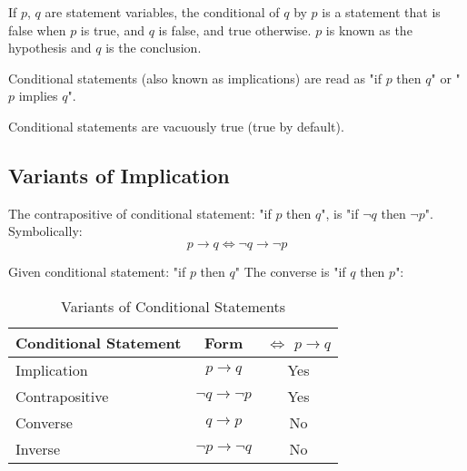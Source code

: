 \documentclass[11pt]{article}
\begin{document}
\begin{definition}[Conditional]\label{def:conditional}
    If $p$, $q$ are statement variables, the conditional of $q$ by $p$
    is a statement that is false when $p$ is true, and $q$ is false, and true
    otherwise. $p$ is known as the hypothesis and $q$ is the conclusion.
\end{definition}

Conditional statements (also known as implications) are read as
"if $p$ then $q$" or "$p$ implies $q$".

Conditional statements are vacuously true (true by default).

\subsection{Variants of Implication}

\begin{definition}[Contrapositive]\label{def:contrapositive}
    The contrapositive of conditional statement: "if $p$ then $q$",
    is "if $\neg q$ then $\neg p$". Symbolically:
    \begin{equation}
        p \to q \iff \neg q \to \neg p
    \end{equation}
\end{definition}

\begin{definition}[Converse]\label{def:converse}
    Given conditional statement: "if $p$ then $q$"
    The converse is "if $q$ then $p$":
\end{definition}

\begin{table}[!htbp]
    \centering
    \begin{tabular}{ l c c}
        \toprule
        Conditional Statement & Form                & $\iff$ $p \to q$ \\
        \midrule
        Implication         & $p \to q$             & Yes \\
        Contrapositive      & $\neg q \to \neg p$   & Yes \\
        Converse            & $q \to p$             & No \\
        Inverse             & $\neg p \to \neg q$   & No \\
        \bottomrule
    \end{tabular}
    \label{tab:tbl-implication-variants}
    \caption{Variants of Conditional Statements}
\end{table}
\end{document}
